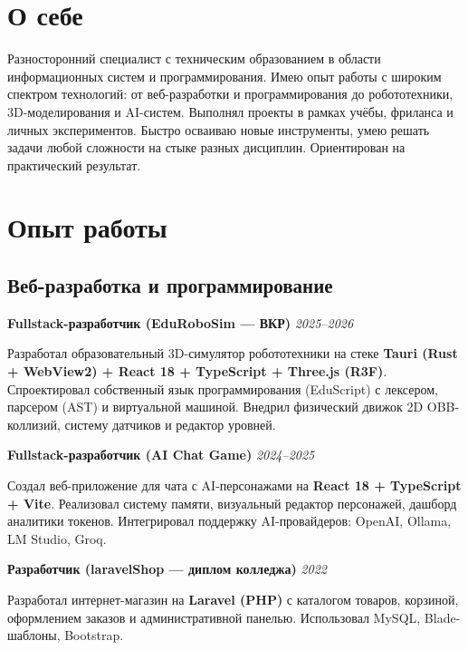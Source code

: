 \documentclass[10pt,a4paper]{article}
\newcommand{\projectEntry}[3]{\textbf{#1} \hfill \textit{#2}\par #3\par\vspace{0.3em}}
\begin{document}

\section{О себе}

Разносторонний специалист с техническим образованием в области информационных систем и программирования. Имею опыт работы с широким спектром технологий: от веб-разработки и программирования до робототехники, 3D-моделирования и AI-систем. Выполнял проекты в рамках учёбы, фриланса и личных экспериментов. Быстро осваиваю новые инструменты, умею решать задачи любой сложности на стыке разных дисциплин. Ориентирован на практический результат.

\section{Опыт работы}

\subsection{Веб-разработка и программирование}

\projectEntry{Fullstack-разработчик (EduRoboSim — ВКР)}{2025–2026}
{Разработал образовательный 3D-симулятор робототехники на стеке \textbf{Tauri (Rust + WebView2) + React 18 + TypeScript + Three.js (R3F)}. Спроектировал собственный язык программирования (EduScript) с лексером, парсером (AST) и виртуальной машиной. Внедрил физический движок 2D OBB-коллизий, систему датчиков и редактор уровней.}

\projectEntry{Fullstack-разработчик (AI Chat Game)}{2024–2025}
{Создал веб-приложение для чата с AI-персонажами на \textbf{React 18 + TypeScript + Vite}. Реализовал систему памяти, визуальный редактор персонажей, дашборд аналитики токенов. Интегрировал поддержку AI-провайдеров: OpenAI, Ollama, LM Studio, Groq.}

\projectEntry{Разработчик (laravelShop — диплом колледжа)}{2022}
{Разработал интернет-магазин на \textbf{Laravel (PHP)} с каталогом товаров, корзиной, оформлением заказов и административной панелью. Использовал MySQL, Blade-шаблоны, Bootstrap.}
\end{document}
